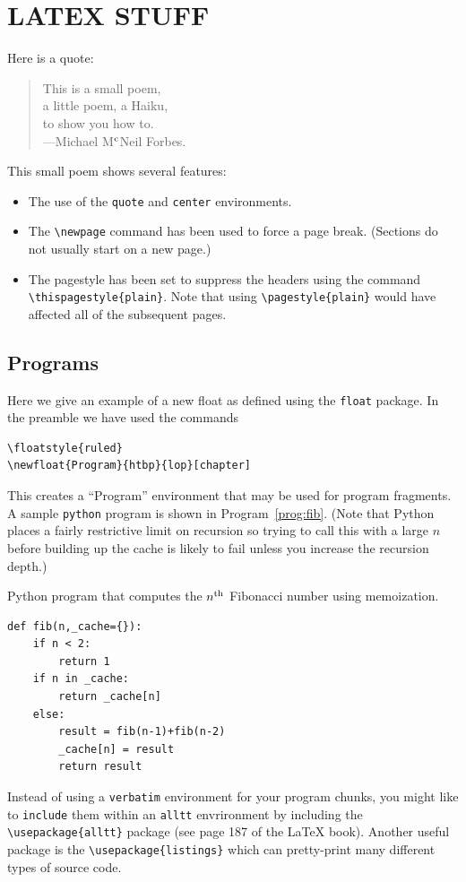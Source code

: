 \documentclass[msc,oneside]{ubcthesis}
\begin{document}
\chapter{LATEX STUFF}

Here is a quote:
\begin{quote}
  \begin{center}
    This is a small poem,\\
    a little poem, a Haiku,\\
    to show you how to.\\
    ---Michael M$^{\rm c}$Neil Forbes.
  \end{center}
\end{quote}

This small poem shows several features:
\begin{itemize}
\item The use of the \verb|quote| and \verb|center| environments.
\item The \verb|\newpage| command has been used to force a page
  break.  (Sections do not usually start on a new page.)
\item The pagestyle has been set to suppress the headers using the
  command \verb|\thispagestyle{plain}|.  Note that using
  \verb|\pagestyle{plain}| would have affected all of the subsequent
  pages.
\end{itemize}
\section{Programs}
Here we give an example of a new float as defined using the
\texttt{float} package.  In the preamble we have used the commands
\begin{verbatim}
\floatstyle{ruled}
\newfloat{Program}{htbp}{lop}[chapter]
\end{verbatim}
This creates a ``Program'' environment that may be used for program
fragments.  A sample \texttt{python} program is shown in
Program~\ref{prog:fib}.  (Note that Python places a fairly restrictive
limit on recursion so trying to call this with a large $n$ before
building up the cache is likely to fail unless you increase the
recursion depth.)
\begin{Program}
  \caption{\label{prog:fib} Python program that computes the $n^{\rm
      th}$ Fibonacci number using memoization.}
\begin{verbatim}
def fib(n,_cache={}):
    if n < 2:
        return 1
    if n in _cache:
        return _cache[n]
    else:
        result = fib(n-1)+fib(n-2)
        _cache[n] = result
        return result
\end{verbatim}
\end{Program}
Instead of using a \texttt{verbatim} environment for your program
chunks, you might like to \texttt{include} them within an
\texttt{alltt} envrironment by including the \verb|\usepackage{alltt}|
package (see page 187 of the \LaTeX{} book).  Another useful package
is the \verb|\usepackage{listings}| which can pretty-print many
different types of source code.
\end{document}
